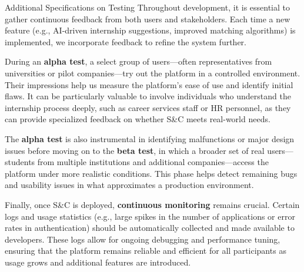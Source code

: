 Additional Specifications on Testing
Throughout development, it is essential to gather continuous feedback from both users and stakeholders. Each time a new feature (e.g., AI-driven internship suggestions, improved matching algorithms) is implemented, we incorporate feedback to refine the system further.

During an \textbf{alpha test}, a select group of users—often representatives from universities or pilot companies—try out the platform in a controlled environment. Their impressions help us measure the platform’s ease of use and identify initial flaws. It can be particularly valuable to involve individuals who understand the internship process deeply, such as career services staff or HR personnel, as they can provide specialized feedback on whether S\&C meets real-world needs.

The \textbf{alpha test} is also instrumental in identifying malfunctions or major design issues before moving on to the \textbf{beta test}, in which a broader set of real users—students from multiple institutions and additional companies—access the platform under more realistic conditions. This phase helps detect remaining bugs and usability issues in what approximates a production environment.

Finally, once S\&C is deployed, \textbf{continuous monitoring} remains crucial. Certain logs and usage statistics (e.g., large spikes in the number of applications or error rates in authentication) should be automatically collected and made available to developers. These logs allow for ongoing debugging and performance tuning, ensuring that the platform remains reliable and efficient for all participants as usage grows and additional features are introduced.
